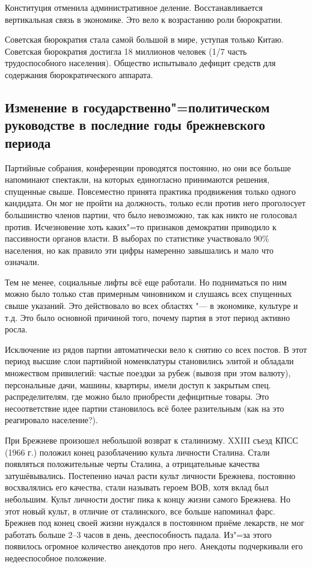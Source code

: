 Конституция отменила административное деление. Восстанавливается вертикальная связь в экономике. Это вело к возрастанию роли бюрократии. 

Советская бюрократия стала самой большой в мире, уступая только Китаю. Советская бюрократия достигла 18 миллионов человек (1/7 часть трудоспособного населения). Общество испытывало дефицит средств для содержания бюрократического аппарата.

\subsection{Изменение в государственно"=политическом руководстве в последние годы брежневского периода}

Партийные собрания, конференции проводятся постоянно, но они все больше напоминают спектакли, на которых единогласно принимаются решения, спущенные свыше. Повсеместно принята практика продвижения только одного кандидата. Он мог не пройти на должность, только если против него проголосует большинство членов партии, что было невозможно, так как никто не голосовал против. Исчезновение хоть каких"=то признаков демократии приводило к пассивности органов власти. В выборах по статистике участвовало 90\% населения, но как правило эти цифры намеренно завышались и мало что означали.

Тем не менее, социальные лифты всё еще работали. Но подниматься по ним можно было только став примерным чиновником и слушаясь всех спущенных свыше указаний. Это действовало во всех областях "--- в экономике, культуре и т.д. Это было основной причиной того, почему партия в этот период активно росла. 

Исключение из рядов партии автоматически вело к снятию со всех постов.
В этот период высшие слои партийной номенклатуры становились элитой и обладали множеством привилегий: частые поездки за рубеж (вывозя при этом валюту), персональные дачи, машины, квартиры, имели доступ к закрытым спец. распределителям, где можно было приобрести дефицитные товары. Это несоответствие идее партии становилось всё более разительным (как на это реагировало население?).

При Брежневе произошел небольшой возврат к сталинизму. XXIII съезд КПСС (1966 г.) положил конец разоблачению культа личности Сталина. Стали появляться положительные черты Сталина, а отрицательные качества затушёвывались. Постепенно начал расти культ личности Брежнева, постоянно восхвалялись его качества, стали называть героем ВОВ, хотя вклад был небольшим. Культ личности достиг пика к концу жизни самого Брежнева. Но этот новый культ, в отличие от сталинского, все больше напоминал фарс. Брежнев под конец своей жизни нуждался в постоянном приёме лекарств, не мог работать больше 2--3 часов в день, дееспособность падала. Из"=за этого появилось огромное количество анекдотов про него. Анекдоты подчеркивали его недееспособное положение.

